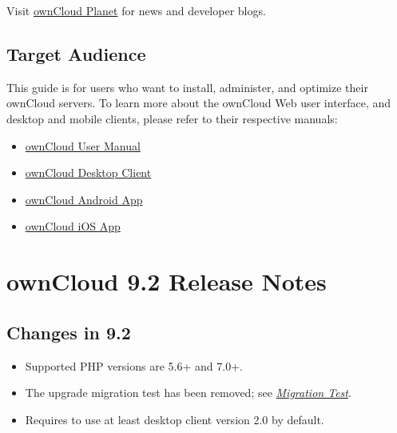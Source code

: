 \documentclass[letterpaper,10pt,english]{sphinxmanual}
\begin{document}
Visit \href{https://owncloud.org/news/}{ownCloud Planet} for news and developer
blogs.


\section{Target Audience}
\label{index:target-audience}
This guide is for users who want to install, administer, and
optimize their ownCloud servers. To learn more about the ownCloud Web
user interface, and desktop and mobile clients, please refer to their
respective manuals:
\begin{itemize}
\item {} 
\href{https://doc.owncloud.org/server/9.2/user\_manual/}{ownCloud User Manual}

\item {} 
\href{https://doc.owncloud.org/desktop/2.2/}{ownCloud Desktop Client}

\item {} 
\href{https://doc.owncloud.org/android/}{ownCloud Android App}

\item {} 
\href{https://doc.owncloud.org/ios/}{ownCloud iOS App}

\end{itemize}


\chapter{ownCloud 9.2 Release Notes}
\label{release_notes::doc}\label{release_notes:owncloud-ios-app}\label{release_notes:owncloud-version-release-notes}

\section{Changes in 9.2}
\label{release_notes:changes-in-9-2}\begin{itemize}
\item {} 
Supported PHP versions are 5.6+ and 7.0+.

\item {} 
The upgrade migration test has been removed; see {\hyperref[maintenance/upgrade:migration-test-label]{\emph{Migration Test}}}.

\item {} 
Requires to use at least desktop client version 2.0 by default.

\end{itemize}
\end{document}
